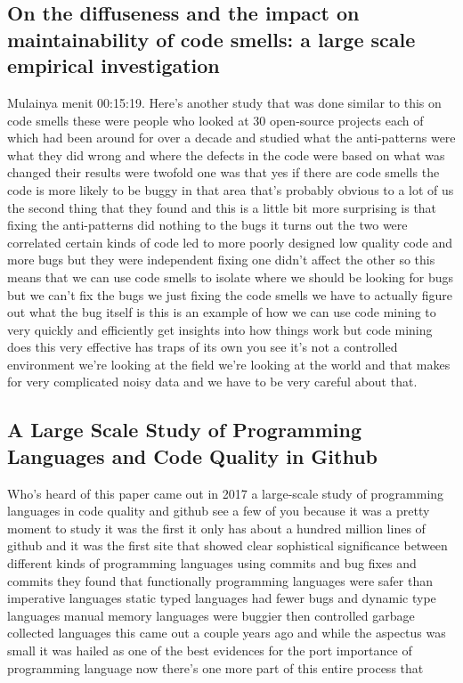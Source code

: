 \documentclass[conference, compsoc, twoside]{IEEEtran}
\begin{document}
\subsection{On the diffuseness and the impact on maintainability of code smells: a large scale empirical investigation}
Mulainya menit 00:15:19.
Here's another study that was done similar to this on code
smells these were people who looked at
30 open-source projects each of which
had been around for over a decade and
studied what the anti-patterns were what
they did wrong and where the defects in
the code were based on what was changed
their results were twofold one was that
yes if there are code smells the code is
more likely to be buggy in that area
that's probably obvious to a lot of us
the second thing that they found and
this is a little bit more surprising is
that
fixing the anti-patterns did nothing to
the bugs it turns out the two were
correlated certain kinds of code led to
more poorly designed low quality code
and more bugs but they were independent
fixing one didn't affect the other so
this means that we can use code smells
to isolate where we should be looking
for bugs but we can't fix the bugs we
just fixing the code smells we have to
actually figure out what the bug itself
is this is an example of how we can use
code mining to very quickly and
efficiently get insights into how things
work but code mining does this very
effective has traps of its own you see
it's not a controlled environment we're
looking at the field we're looking at
the world and that makes for very
complicated noisy data and we have to be
very careful about that.

\subsection{A Large Scale Study of Programming Languages and Code Quality in Github}
Who's heard of this paper came out in 2017 a large-scale study of programming languages in code quality and github see a few of you because it was a pretty moment to study it was the first it only has about a hundred million lines of github and it was the first site that showed clear sophistical significance between different kinds of programming languages using commits and bug fixes and commits they found that functionally programming languages were safer than imperative languages static typed languages had fewer bugs and dynamic type languages manual memory languages were buggier then controlled garbage collected languages this came out a couple years ago and while the aspectus was small it was hailed as one of the best evidences for the port importance of programming language now there's one more part of this entire process that 
\end{document}
